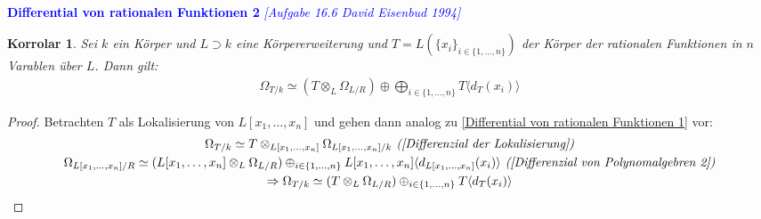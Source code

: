 \documentclass[10pt,a4paper]{report}
\newcommand{\ModulsOfDifferenzials}{David Eisenbud 1994}
\newcounter{Aussage}[chapter]
\newtheorem{korrolar}[Aussage]{Korrolar}
\newcommand{\divR}[2]{\Omega_{#1/#2}}
\newcommand{\divf}[1]{d_{#1}}
\newcommand{\Tensor}[3]{#1 \otimes_{#2} #3}
\newcommand{\Verz}[1]{\langle #1 \rangle}
\begin{document}
\ \\
\textcolor{blue}{\textbf{Differential von rationalen Funktionen 2} \textit{[Aufgabe 16.6 \ModulsOfDifferenzials]}}
\begin{korrolar}\label{Differential von rationalen Funktionen 2}
Sei $k$ ein Körper und $L \supset k$ eine Körpererweiterung und $T = L(\lbrace x_i \rbrace_{i \in \lbrace 1,\dots,n \rbrace})$ der Körper der rationalen Funktionen in $n$ Varablen über $L$. Dann gilt:
\begin{gather*}
\divR{T}{k} \simeq (\Tensor{T}{L}{\divR{L}{R}}) \oplus \bigoplus_{i \in \lbrace 1,\dots,n \rbrace} T \Verz{\divf{T}(x_i)}
\end{gather*}
\end{korrolar}
\begin{proof}
Betrachten $T$ als Lokalisierung von $L[x_1,\dots,x_n]$ und gehen dann analog zu \cref{Differential von rationalen Funktionen 1} vor:
\begin{gather*}
\divR{T}{k} \simeq \Tensor{T}{L[x_1,\dots,x_n]}{\divR{L[x_1,\dots,x_n]}{k}} \textit{ (\cref{Differenzial der Lokalisierung})} \\
\divR{L[x_1,\dots,x_n]}{R} \simeq (\Tensor{L[x_1,\dots,x_n]}{L}{\divR{L}{R}}) \oplus_{i \in \lbrace 1,...,n \rbrace} L[x_1,\dots,x_n] \Verz{\divf{L[x_1,\dots,x_n]}(x_i)} \textit{ (\cref{Differenzial von Polynomalgebren 2})} \\
\Rightarrow \divR{T}{k} \simeq (\Tensor{T}{L}{\divR{L}{R}}) \oplus_{i \in \lbrace 1,\dots,n \rbrace} T \Verz{\divf{T}(x_i)}
\end{gather*}
\end{proof}
\end{document}
